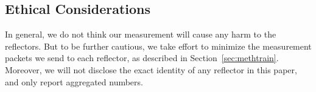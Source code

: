 \subsection{Ethical Considerations}
\label{sec:ethics}

In general, we do not think our measurement will cause any harm to the
reflectors. But to be further cautious, we take effort to minimize the
measurement packets we send to each reflector, as described in
Section~\ref{sec:methtrain}. Moreover, we will not disclose the exact
identity of any reflector in this paper, and only report aggregated
numbers.

